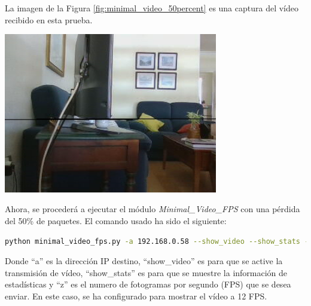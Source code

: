 \newpage
La imagen de la Figura \ref{fig:minimal_video_50percent} es una captura del vídeo recibido en esta prueba.
\begin{center}
  \includegraphics[width = 0.7\textwidth]{images/VideoRecibido9.1.png}
  \label{fig:minimal_video_50percent}
\end{center}

\newpage


Ahora, se procederá a ejecutar el módulo \textit{Minimal\_Video\_FPS} con una pérdida del 50\% de paquetes. El comando usado ha sido el siguiente:

\begin{lstlisting}[language=bash, basicstyle=\ttfamily\scriptsize]
    python minimal_video_fps.py -a 192.168.0.58 --show_video --show_stats -z 12
\end{lstlisting}
Donde ``a'' es la dirección IP destino, ``show\_video'' es para que se active la transmisión de vídeo, ``show\_stats'' es para que se muestre la información de estadísticas y ``z'' es el numero de fotogramas por segundo (FPS) que se desea enviar. En este caso, se ha configurado para mostrar el vídeo a 12 FPS.
\vspace{\baselineskip}

